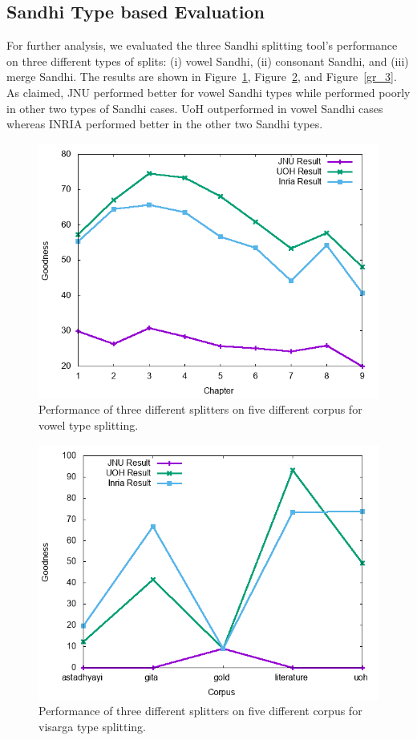 \documentclass[11pt]{article}
\begin{document}
\subsection{Sandhi Type based Evaluation}

For further analysis, we evaluated the three Sandhi splitting tool's performance on three different types of splits: (i) vowel Sandhi, (ii) consonant Sandhi, and (iii) merge Sandhi. The results are shown in Figure~\ref{gr_1}, Figure~\ref{gr_2}, and Figure~\ref{gr_3}. As claimed, JNU performed better for vowel Sandhi types while performed poorly in other two types of Sandhi cases. UoH outperformed in vowel Sandhi cases whereas INRIA performed better in the other two Sandhi types.

\begin{figure}[h]
	\center
	\includegraphics[scale=0.34]{images/merge.png}
	\caption{\label{gr_1}Performance of three different splitters on five different corpus for vowel type splitting.}
\end{figure}

\begin{figure}[h]
	\center
	\includegraphics[scale=0.34]{images/visarga.png}
	\caption{\label{gr_2}Performance of three different splitters on five different corpus for visarga type splitting.}
\end{figure}
\end{document}
